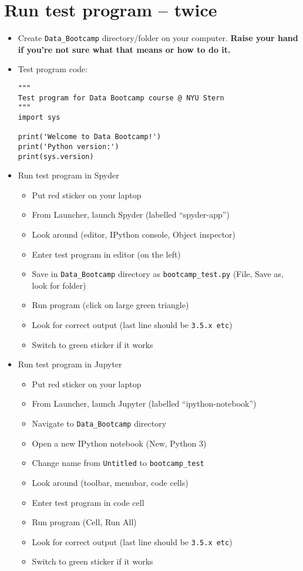 \documentclass[11pt]{article}
\begin{document}
\section*{Run test program -- twice}

\begin{itemize}
\item Create \verb|Data_Bootcamp| directory/folder on your computer.
{\bf Raise your hand if you're not sure what that means or how to do it.}

\item Test program code:

\vspace{-0.1in}
\begin{verbatim}
"""
Test program for Data Bootcamp course @ NYU Stern
"""
import sys

print('Welcome to Data Bootcamp!')
print('Python version:')
print(sys.version)
\end{verbatim}

\item Run test program in Spyder 
\begin{itemize}
\item Put red sticker on your laptop
\item From Launcher, launch Spyder (labelled ``spyder-app'')
\item Look around (editor, IPython console, Object inspector)
\item Enter test program in editor (on the left)
\item Save in \verb|Data_Bootcamp| directory as \verb|bootcamp_test.py|
(File, Save as, look for folder)
\item Run program (click on large green triangle)
\item Look for correct output (last line should be {\tt 3.5.x etc})
\item Switch to green sticker if it works
\end{itemize}

\item Run test program in Jupyter
\begin{itemize}
\item Put red sticker on your laptop
\item From Launcher, launch Jupyter (labelled ``ipython-notebook'')
\item Navigate to \verb|Data_Bootcamp| directory
\item Open a new IPython notebook (New, Python 3)
\item Change name from {\tt Untitled} to \verb|bootcamp_test|
\item Look around (toolbar, menubar, code cells)
\item Enter test program in code cell
\item Run program (Cell, Run All)
\item Look for correct output (last line should be {\tt 3.5.x etc})
\item Switch to green sticker if it works
\end{itemize}
\end{itemize}
\end{document}
